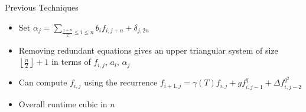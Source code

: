 \documentclass{beamer}
\begin{document}
\begin{frame}{Previous Techniques}

\begin{itemize}

        \item Set $\alpha_j = \sum_{\frac{j+n}{2} \leq i \leq n} b_i f_{i,j + n} + \delta_{j,2n}$
    \item Removing redundant equations gives an upper triangular system of size $\left\lfloor \frac{n}{2} \right\rfloor + 1$ in terms of $f_{i,j}$, $a_i$, $\alpha_j$
    \item Can compute $f_{i,j}$ using the recurrence $f_{i+1,j} = \gamma(T) f_{i,j} + g f_{i,j-1}^q + \Delta f_{i,j-2}^{q^2}$

\item Overall runtime cubic in $n$

\end{itemize}

    
\end{frame}

\end{document}
